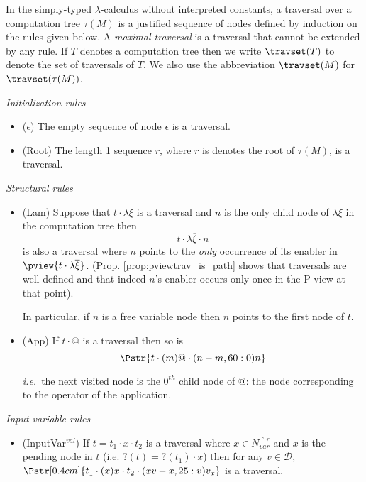 \begin{dfn}
\label{def:traversal}
In the simply-typed $\lambda$-calculus without interpreted constants, a traversal over a computation tree $\tau(M)$ is a justified sequence of nodes defined by induction on the rules
given below. A \emph{maximal-traversal} is a traversal that cannot be
extended by any rule. If $T$ denotes a computation tree then we write $\travset(T)$
to denote the set of traversals of $T$. We also use the abbreviation $\travset(M)$ for $\travset(\tau(M))$.

\emph{Initialization rules}
\begin{itemize}
\item ($\epsilon$) The empty sequence of node $\epsilon$ is a traversal.
\item (Root) The length 1 sequence $r$, where $r$ is denotes the root of $\tau(M)$, is a traversal.
\end{itemize}

\emph{Structural rules}
\begin{itemize}
\item (Lam) Suppose that $t \cdot \lambda \overline{\xi}$ is a traversal and $n$ is the only child node of $\lambda \overline{\xi}$ in
the computation tree then
$$t \cdot \lambda \overline{\xi} \cdot n$$
is also a traversal
where $n$ points to the \emph{only} occurrence of its enabler in $\pview{t \cdot \lambda \overline{\xi}}$.
(Prop. \ref{prop:pviewtrav_is_path} shows that traversals are well-defined and that indeed $n$'s enabler occurs only once in the P-view at that point).

In particular, if $n$ is a free variable node then $n$ points to the first node of $t$.

\item (App) If $t \cdot @$ is a traversal then so is
$$\Pstr{t \cdot (m){@} \cdot (n-m,60:0){n}}$$

{\it i.e.}~the next visited node is the $0^{th}$ child node of
@: the node corresponding to the operator of the application.
\end{itemize}

\emph{Input-variable rules}
\begin{itemize}
\item (InputVar$^{val}$) If $t = t_1 \cdot x \cdot t_2$ is a traversal where $x \in N^{\upharpoonright r}_{var}$ and $x$ is the pending node in $t$ (i.e. $?(t)=?(t_1) \cdot x$) then for any $v \in \mathcal{D}$,
$\Pstr[0.4cm]{t_1 \cdot (x){x} \cdot t_2 \cdot
(xv-x,25:v){v_x}}$ is a traversal.



\end{itemize}
\end{dfn}

